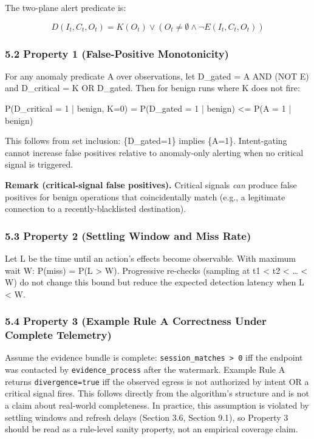 \documentclass[
]{article}
\newenvironment{Shaded}{}{}
\newcommand{\NormalTok}[1]{#1}
\begin{document}
The two-plane alert predicate is:

\[
D(I_t, C_t, O_t) = K(O_t) \lor (O_t \neq \emptyset \land \neg E(I_t, C_t, O_t))
\]

\subsubsection{5.2 Property 1 (False-Positive
Monotonicity)}\label{property-1-false-positive-monotonicity}

For any anomaly predicate A over observations, let D\_gated = A AND (NOT
E) and D\_critical = K OR D\_gated. Then for benign runs where K does
not fire:

\begin{Shaded}
\begin{Highlighting}[]
\NormalTok{P(D\_critical = 1 | benign, K=0) = P(D\_gated = 1 | benign) \textless{}= P(A = 1 | benign)}
\end{Highlighting}
\end{Shaded}

This follows from set inclusion: \{D\_gated=1\} implies \{A=1\}.
Intent-gating cannot increase false positives relative to anomaly-only
alerting when no critical signal is triggered.

\textbf{Remark (critical-signal false positives).} Critical signals
\emph{can} produce false positives for benign operations that
coincidentally match (e.g., a legitimate connection to a
recently-blacklisted destination).

\subsubsection{5.3 Property 2 (Settling Window and Miss
Rate)}\label{property-2-settling-window-and-miss-rate}

Let L be the time until an action's effects become observable. With
maximum wait W: P(miss) = P(L \textgreater{} W). Progressive re-checks
(sampling at t1 \textless{} t2 \textless{} \ldots{} \textless{} W) do
not change this bound but reduce the expected detection latency when L
\textless{} W.

\subsubsection{5.4 Property 3 (Example Rule A Correctness Under Complete
Telemetry)}\label{property-3-example-rule-a-correctness-under-complete-telemetry}

Assume the evidence bundle is complete:
\texttt{session\_matches\ \textgreater{}\ 0} iff the endpoint was
contacted by \texttt{evidence\_process} after the watermark. Example
Rule A returns \texttt{divergence=true} iff the observed egress is not
authorized by intent OR a critical signal fires. This follows directly
from the algorithm's structure and is not a claim about real-world
completeness. In practice, this assumption is violated by settling
windows and refresh delays (Section 3.6, Section 9.1), so Property 3
should be read as a rule-level sanity property, not an empirical
coverage claim.
\end{document}
